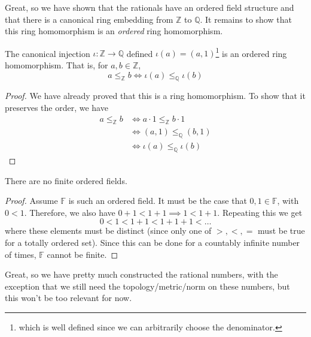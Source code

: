   Great, so we have shown that the rationals have an ordered field structure and that there is a canonical ring embedding from $\mathbb{Z}$ to $\mathbb{Q}$. It remains to show that this ring homomorphism is an \textit{ordered} ring homomorphism. 

  \begin{theorem}
    The canonical injection $\iota: \mathbb{Z} \rightarrow \mathbb{Q}$ defined $\iota(a) = (a, 1)$\footnote{which is well defined since we can arbitrarily choose the denominator.} is an ordered ring homomorphism. That is, for $a, b \in \mathbb{Z}$, 
    \begin{equation}
      a \leq_{\mathbb{Z}} b \iff \iota(a) \leq_{\mathbb{Q}} \iota(b)
    \end{equation}
  \end{theorem}
  \begin{proof} 
    We have already proved that this is a ring homomorphism. To show that it preserves the order, we have 
    \begin{align}
      a \leq_{\mathbb{Z}} b & \iff a \cdot 1 \leq_{\mathbb{Z}} b \cdot 1 \\
                            & \iff (a, 1) \leq_{\mathbb{Q}} (b, 1) \\
                            & \iff \iota(a) \leq_{\mathbb{Q}} \iota(b)
    \end{align}
  \end{proof} 

  \begin{theorem}
    There are no finite ordered fields. 
  \end{theorem} 
  \begin{proof}
    Assume $\mathbb{F}$ is such an ordered field. It must be the case that $0, 1 \in \mathbb{F}$, with $0 < 1$. Therefore, we also have $0 + 1 < 1 + 1 \implies 1 < 1 + 1$. Repeating this we get 
    \begin{equation}
      0 < 1 < 1 + 1 < 1 + 1 + 1 < \ldots
    \end{equation}
    where these elements must be distinct (since only one of $>, <, =$ must be true for a totally ordered set). Since this can be done for a countably infinite number of times, $\mathbb{F}$ cannot be finite. 
  \end{proof}

  Great, so we have pretty much constructed the rational numbers, with the exception that we still need the topology/metric/norm on these numbers, but this won't be too relevant for now. 

